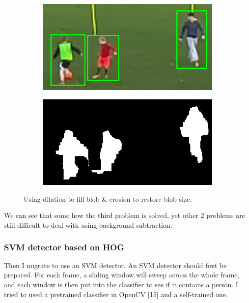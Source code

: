 \documentclass{article}
\begin{document}
\begin{figure}[h!]
  \begin{subfigure}[b]{\linewidth}
  \centering
    \includegraphics[scale=0.4]{report/pic/3/complete_blob_1.png} 
  \end{subfigure}
  \begin{subfigure}[b]{\linewidth}
  \centering
    \includegraphics[scale=0.4]{report/pic/3/complete_blob.png} 
  \end{subfigure}
  \caption{Using dilation to fill blob \& erosion to restore blob size.}
\end{figure}
We can see that some how the third problem is solved, yet other 2 problems are still difficult to deal with using background subtraction.
\subsubsection{SVM detector based on HOG}
Then I migrate to use an SVM detector. An SVM detector should first be prepared. For each frame, a sliding window will sweep across the whole frame, and each window is then put into the classifier to see if it contains a person. I tried to used a pretrained classifier in OpenCV [15] and a self-trained one.
\end{document}
